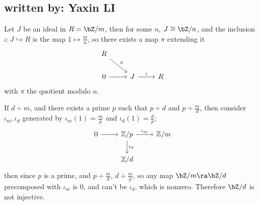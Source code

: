 \subsection{written by: Yaxin LI}
Let $J$ be an ideal in $R=\bZ/m$, then for some $n$, $J\cong\bZ/n$, and the inclusion $\iota:J\hookrightarrow R$ is the map $1\mapsto\frac{m}{n}$, so there exists a map $\pi$ extending it
\[
\begin{tikzcd}
    R \arrow[rd, "\pi"] &                      &   \\
    0 \arrow[r]         & J \arrow[r, "\iota"] & R
    \end{tikzcd}
\]
with $\pi$ the quotient modulo $n$.

If $d\div m$, and there exists a prime $p$ such that $p\div d$ and $p\div \frac{m}{d}$, then consider $\iota_m,\iota_d$ generated by $\iota_m(1)=\frac{m}{p}$ and $\iota_d(1)=\frac{d}{p}$;
\[
\begin{tikzcd}
    0 \arrow[r] & \mathbb{Z}/p \arrow[r, "\iota_m"] \arrow[d, "\iota_d"] & \mathbb{Z}/m \\
                & \mathbb{Z}/d                                           &             
    \end{tikzcd}
\]
then since $p$ is a prime, and $p\div\frac{m}{d}$, $d\div\frac{m}{p}$, so any map $\bZ/m\ra\bZ/d$ precomposed with $\iota_m$ is 0, and can't be $\iota_d$, which is nonzero. Therefore $\bZ/d$ is not injective.